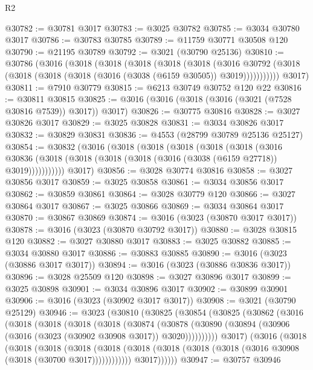 \begin{lexlean}{R2}
\begin{coremodule}
@30782 := @30781 @3017
@30783 := @3025 @30782
@30785 := @3034 @30780 @3017
@30786 := @30783 @30785
@30789 := @11759 @30771 @30508 @120
@30790 := @21195 @30789
@30792 := @3021 (@30790 @25136)
@30810 := @30786
    (@3016
      (@3018
        (@3018
          (@3018
            (@3018
              (@3018
                (@3016
                  @30792
                  (@3018 (@3018 (@3018 (@3018 (@3016 (@3038 (@6159 @30505)) @3019)))))))))))
      @3017)
@30811 := @7910 @30779
@30815 := @6213 @30749 @30752 @120 @22
@30816 := @30811 @30815
@30825 := @3016 (@3016 (@3018 (@3016 (@3021 (@7528 @30816 @7539)) @3017)) @3017)
@30826 := @30775 @30816
@30828 := @3027 @30826 @3017
@30829 := @3025 @30828
@30831 := @3034 @30826 @3017
@30832 := @30829 @30831
@30836 := @4553 (@28799 @30789 @25136 @25127)
@30854 := @30832
    (@3016
      (@3018
        (@3018
          (@3018
            (@3018
              (@3018
                (@3016
                  @30836
                  (@3018 (@3018 (@3018 (@3018 (@3016 (@3038 (@6159 @27718)) @3019)))))))))))
      @3017)
@30856 := @3028 @30774 @30816
@30858 := @3027 @30856 @3017
@30859 := @3025 @30858
@30861 := @3034 @30856 @3017
@30862 := @30859 @30861
@30864 := @3028 @30779 @120
@30866 := @3027 @30864 @3017
@30867 := @3025 @30866
@30869 := @3034 @30864 @3017
@30870 := @30867 @30869
@30874 := @3016 (@3023 (@30870 @3017 @3017))
@30878 := @3016 (@3023 (@30870 @30792 @3017))
@30880 := @3028 @30815 @120
@30882 := @3027 @30880 @3017
@30883 := @3025 @30882
@30885 := @3034 @30880 @3017
@30886 := @30883 @30885
@30890 := @3016 (@3023 (@30886 @3017 @3017))
@30894 := @3016 (@3023 (@30886 @30836 @3017))
@30896 := @3028 @25509 @120
@30898 := @3027 @30896 @3017
@30899 := @3025 @30898
@30901 := @3034 @30896 @3017
@30902 := @30899 @30901
@30906 := @3016 (@3023 (@30902 @3017 @3017))
@30908 := @3021 (@30790 @25129)
@30946 := @3023
    (@30810
      (@30825
        (@30854
          (@30825
            (@30862
              (@3016
                (@3018
                  (@3018
                    (@3018
                      (@3018
                        (@30874
                          (@30878
                            (@30890
                              (@30894 (@30906 (@3016 (@3023 (@30902 @30908 @3017)) @3020))))))))))
                @3017)
              (@3016
                (@3018
                  (@3018
                    (@3018
                      (@3018
                        (@3018
                          (@3018 (@3018 (@3018 (@3018 (@3016 @30908 (@3018 (@30700 @3017))))))))))))
                @3017))))))
@30947 := @30757 @30946

\end{coremodule}
\end{lexlean}
